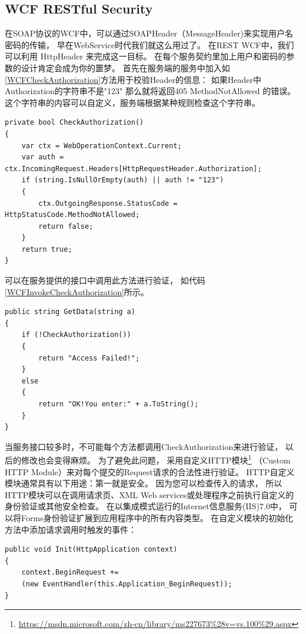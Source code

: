 \documentclass{book}
\begin{document}
\subsection{WCF RESTful Security}

在SOAP协议的WCF中，可以通过SOAPHeader（MessageHeader)来实现用户名密码的传输，
早在WebService时代我们就这么用过了。
在REST WCF中，我们可以利用 HttpHeader 来完成这一目标。
在每个服务契约里加上用户和密码的参数的设计肯定会成为你的噩梦。
首先在服务端的服务中加入如\ref{WCFCheckAuthorization}方法用于校验Header的信息：
如果Header中Authorization的字符串不是"123" 那么就将返回405 MethodNotAllowed 的错误。
这个字符串的内容可以自定义，服务端根据某种规则检查这个字符串。

\begin{lstlisting}[language={[Sharp]C},caption=WCF验证方法,label=WCFCheckAuthorization]
private bool CheckAuthorization()
{
    var ctx = WebOperationContext.Current;
    var auth = ctx.IncomingRequest.Headers[HttpRequestHeader.Authorization];
    if (string.IsNullOrEmpty(auth) || auth != "123")
    {
        ctx.OutgoingResponse.StatusCode = HttpStatusCode.MethodNotAllowed;
        return false;
    }
    return true;
} 
\end{lstlisting}

可以在服务提供的接口中调用此方法进行验证，
如代码\ref{WCFInvokeCheckAuthorization}所示。

\begin{lstlisting}[language={[Sharp]C},caption=WCF调用验证方法,label=WCFInvokeCheckAuthorization]
public string GetData(string a)
{
    if (!CheckAuthorization())
    {
        return "Access Failed!";
    }
    else
    {
        return "OK!You enter:" + a.ToString();
    }
}
\end{lstlisting}


当服务接口较多时，不可能每个方法都调用CheckAuthorization来进行验证，
以后的修改也会变得麻烦。
为了避免此问题，
采用自定义HTTP模块\footnote{\url{https://msdn.microsoft.com/zh-cn/library/ms227673\%28v=vs.100\%29.aspx}}
（Custom HTTP Module）来对每个提交的Request请求的合法性进行验证。
HTTP自定义模块通常具有以下用途：第一就是安全。
因为您可以检查传入的请求，
所以HTTP模块可以在调用请求页、XML Web services或处理程序之前执行自定义的身份验证或其他安全检查。
在以集成模式运行的Internet信息服务(IIS)7.0中，
可以将Forms身份验证扩展到应用程序中的所有内容类型。
在自定义模块的初始化方法中添加请求调用时触发的事件：

\begin{lstlisting}[language={[Sharp]C}]
public void Init(HttpApplication context)
{
    context.BeginRequest +=
    (new EventHandler(this.Application_BeginRequest));
}
\end{lstlisting}
\end{document}
